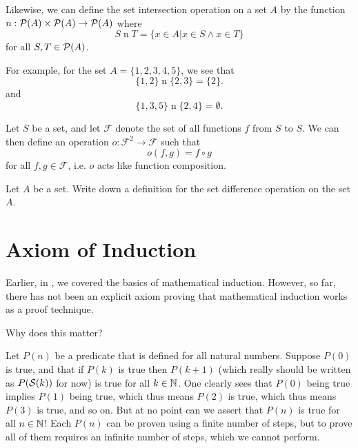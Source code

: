 \begin{example}
    \setlength{\parindent}{1.5em}

    Likewise, we can define the set intersection operation on a set $A$ by the function $n: {\mathcal{P}(A)} \times {\mathcal{P}(A)} \to {\mathcal{P}(A)}$ where
    \[
        S \mathrel{n} T = \{x \in A \vert x \in S \land x \in T\}
    \]
    for all $S, T \in {\mathcal{P}(A)}$.

    For example, for the set $A = \{1, 2, 3, 4, 5\}$, we see that
    \[
        \{1,2\}\mathrel{n}\{2,3\} = \{2\}.
    \]
    and
    \[
        \{1, 3, 5\}\mathrel{n}\{2, 4\} = \emptyset.
    \]
\end{example}

\begin{example}
    Let $S$ be a set, and let $\mathcal{F}$ denote the set of all functions $f$ from $S$ to $S$. We can then define an operation $o: \mathcal{F}^2 \to \mathcal{F}$ such that
    \[
        o(f, g) = f \circ g
    \]
    for all $f, g \in \mathcal{F}$, i.e. $o$ acts like function composition.
\end{example}

\begin{exercise}
    Let $A$ be a set. Write down a definition for the set difference operation on the set $A$.
\end{exercise}

\section{Axiom of Induction}
Earlier, in , we covered the basics of mathematical induction. However, so far, there has not been an explicit axiom proving that mathematical induction works as a proof technique.

Why does this matter?

Let $P(n)$ be a predicate that is defined for all natural numbers. Suppose $P(0)$ is true, and that if $P(k)$ is true then $P(k+1)$ (which really should be written as $P({\mathcal{S}(k)})$ for now) is true for all $k \in \mathbb{N}$. One clearly sees that $P(0)$ being true implies $P(1)$ being true, which thus means $P(2)$ is true, which thus means $P(3)$ is true, and so on. But at no point can we assert that $P(n)$ is true for all $n \in \mathbb{N}$! Each $P(n)$ can be proven using a finite number of steps, but to prove all of them requires an infinite number of steps, which we cannot perform.

